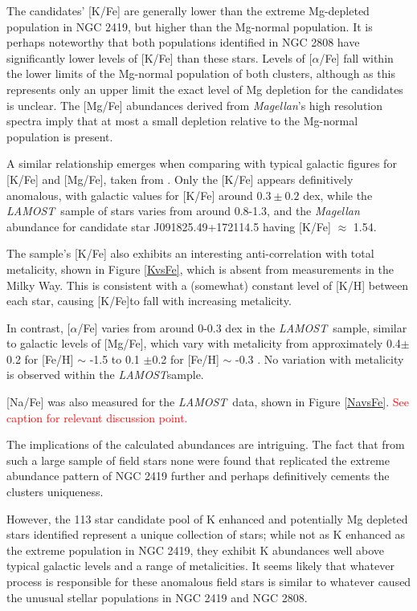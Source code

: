 \documentclass[a4paper,fleqn,usenatbib]{mnras}
\newcommand{\todo}[1]{\textcolor{red}{#1}}
\newcommand{\project}[1]{\emph{#1}}
\newcommand{\lamost}{\project{LAMOST}}
\begin{document}
The candidates' [K/Fe] are generally lower than the extreme Mg-depleted population in NGC 2419, but higher than the Mg-normal population. It is perhaps noteworthy that both populations identified in NGC 2808 have significantly lower levels of [K/Fe] than these stars.
Levels of [$\alpha$/Fe] fall within the lower limits of the Mg-normal population of both clusters, although as this represents only an upper limit the exact level of Mg depletion for the candidates is unclear. The [Mg/Fe] abundances derived from \textit{Magellan}'s high resolution spectra imply that at most a small depletion relative to the Mg-normal population is present.

A similar relationship emerges when comparing with typical galactic figures for [K/Fe] and [Mg/Fe], taken from \cite{kobayashi2011}.
Only the [K/Fe] appears definitively anomalous, with galactic values for [K/Fe] around $0.3 \pm 0.2$ dex, while the \lamost \ sample of stars varies from around 0.8-1.3, and the \textit{Magellan} abundance for candidate star J091825.49+172114.5 having [K/Fe] $\approx$ 1.54.

The sample's [K/Fe] also exhibits an interesting anti-correlation with total metalicity, shown in Figure \ref{KvsFe}, which is absent from measurements in the Milky Way. This is consistent with a (somewhat) constant level of [K/H] between each star, causing [K/Fe]to fall with increasing metalicity.

In contrast, [$\alpha$/Fe] varies from around 0-0.3 dex in the \lamost \ sample, similar to galactic levels of [Mg/Fe], which vary with metalicity from approximately 0.4$\pm$0.2 for [Fe/H] $\sim$ -1.5 to 0.1 $\pm$0.2 for [Fe/H] $\sim$ -0.3 \citep{kobayashi2011}. No variation with metalicity is observed within the \lamost sample.

[Na/Fe] was also measured for the \lamost\ data, shown in Figure \ref{NavsFe}. \todo{See caption for relevant discussion point.}

The implications of the calculated abundances are intriguing. The fact that from such a large sample of field stars none were found that replicated the extreme abundance pattern of NGC 2419 further and perhaps definitively cements the clusters uniqueness.

However, the 113 star candidate pool of K enhanced and potentially Mg depleted stars identified represent a unique collection of stars; while not as K enhanced as the extreme population in NGC 2419, they exhibit K abundances well above typical galactic levels and a range of metalicities. It seems likely that whatever process is responsible for these anomalous field stars is similar to whatever caused the unusual stellar populations in NGC 2419 and NGC 2808.
\end{document}
